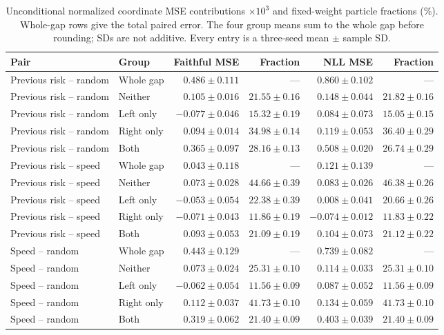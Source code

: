\begin{table}[ht]
\centering\small
\caption{Unconditional normalized coordinate MSE contributions $\times10^3$
and fixed-weight particle fractions (\%). Whole-gap rows give the total paired
error. The four group means sum to the whole gap before rounding; SDs are not
additive. Every entry is a three-seed mean $\pm$ sample SD.}
\label{tab:optional-exposure}
\begin{tabular}{llrrrr}
\toprule
Pair & Group & Faithful MSE & Fraction & NLL MSE & Fraction\\
\midrule
Previous risk -- random & Whole gap & $0.486\pm0.111$ & --- & $0.860\pm0.102$ & ---\\
Previous risk -- random & Neither & $0.105\pm0.016$ & $21.55\pm0.16$ & $0.148\pm0.044$ & $21.82\pm0.16$\\
Previous risk -- random & Left only & $-0.077\pm0.046$ & $15.32\pm0.19$ & $0.084\pm0.073$ & $15.05\pm0.15$\\
Previous risk -- random & Right only & $0.094\pm0.014$ & $34.98\pm0.14$ & $0.119\pm0.053$ & $36.40\pm0.29$\\
Previous risk -- random & Both & $0.365\pm0.097$ & $28.16\pm0.13$ & $0.508\pm0.020$ & $26.74\pm0.29$\\
\midrule
Previous risk -- speed & Whole gap & $0.043\pm0.118$ & --- & $0.121\pm0.139$ & ---\\
Previous risk -- speed & Neither & $0.073\pm0.028$ & $44.66\pm0.39$ & $0.083\pm0.026$ & $46.38\pm0.26$\\
Previous risk -- speed & Left only & $-0.053\pm0.054$ & $22.38\pm0.39$ & $0.008\pm0.041$ & $20.66\pm0.26$\\
Previous risk -- speed & Right only & $-0.071\pm0.043$ & $11.86\pm0.19$ & $-0.074\pm0.012$ & $11.83\pm0.22$\\
Previous risk -- speed & Both & $0.093\pm0.053$ & $21.09\pm0.19$ & $0.104\pm0.073$ & $21.12\pm0.22$\\
\midrule
Speed -- random & Whole gap & $0.443\pm0.129$ & --- & $0.739\pm0.082$ & ---\\
Speed -- random & Neither & $0.073\pm0.024$ & $25.31\pm0.10$ & $0.114\pm0.033$ & $25.31\pm0.10$\\
Speed -- random & Left only & $-0.062\pm0.054$ & $11.56\pm0.09$ & $0.087\pm0.052$ & $11.56\pm0.09$\\
Speed -- random & Right only & $0.112\pm0.037$ & $41.73\pm0.10$ & $0.134\pm0.059$ & $41.73\pm0.10$\\
Speed -- random & Both & $0.319\pm0.062$ & $21.40\pm0.09$ & $0.403\pm0.039$ & $21.40\pm0.09$\\
\midrule
\end{tabular}
\end{table}

